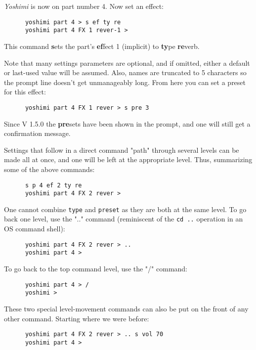    \textsl{Yoshimi} is now on part number 4. Now set an effect:

   \begin{verbatim}
      yoshimi part 4 > s ef ty re
      yoshimi part 4 FX 1 rever-1 >
   \end{verbatim}

   This command \textbf{s}ets the part's \textbf{ef}fect 1 (implicit) to
   \textbf{ty}pe \textbf{re}verb.

   Note that many settings parameters are optional, and if omitted,
   either a default or last-used value will be assumed. Also, names are
   truncated to 5 characters so the prompt line doesn't get unmanageably long.
   From here you can set a preset for this effect:

   \begin{verbatim}
      yoshimi part 4 FX 1 rever > s pre 3
   \end{verbatim}

   Since V 1.5.0 the \textbf{pre}sets have been shown in the prompt, and one
   will still get a confirmation message.

   Settings that follow in a direct command "path" through several levels
   can be made all at once, and one will be left at the appropriate level.
   Thus, summarizing some of the above commands:

   \begin{verbatim}
      s p 4 ef 2 ty re
      yoshimi part 4 FX 2 rever >
   \end{verbatim}

   One cannot combine \texttt{type} and \texttt{preset} as they
   are both at the same level.  To go back one level, use the
   ".." command (reminiscent of the \texttt{cd ..} operation in an OS command
   shell):

   \begin{verbatim}
      yoshimi part 4 FX 2 rever > ..
      yoshimi part 4 >
   \end{verbatim}

   To go back to the top command level, use the "/" command:

   \begin{verbatim}
      yoshimi part 4 > /
      yoshimi >
   \end{verbatim}

   These two special level-movement commands can also be put on the front of
   any other command.  Starting where we were before:

   \begin{verbatim}
      yoshimi part 4 FX 2 rever > .. s vol 70
      yoshimi part 4 >
   \end{verbatim}


